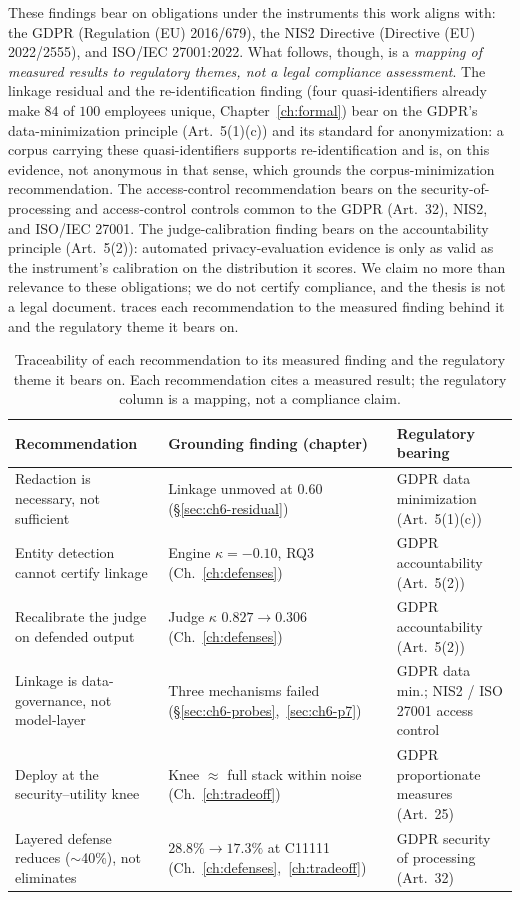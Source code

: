These findings bear on obligations under the instruments this work aligns with: the GDPR
(Regulation (EU) 2016/679), the NIS2 Directive (Directive (EU) 2022/2555), and ISO/IEC 27001:2022.
What follows, though, is a \emph{mapping of measured results to regulatory themes, not a legal compliance
assessment}. The linkage residual and the re-identification finding (four quasi-identifiers already make
$84$ of $100$ employees unique, Chapter~\ref{ch:formal}) bear on the GDPR's data-minimization principle
(Art.\ 5(1)(c)) and its standard for anonymization: a corpus carrying these quasi-identifiers supports
re-identification and is, on this evidence, not anonymous in that sense, which grounds the
corpus-minimization recommendation. The access-control recommendation bears on the security-of-processing
and access-control controls common to the GDPR (Art.\ 32), NIS2, and ISO/IEC 27001. The judge-calibration
finding bears on the accountability principle (Art.\ 5(2)): automated privacy-evaluation evidence is only
as valid as the instrument's calibration on the distribution it scores. We claim no more than relevance to
these obligations; we do not certify compliance, and the thesis is not a legal document.  traces each recommendation to the measured finding behind it and the regulatory theme it bears on.

\begin{table}[h]
\centering
\caption[Traceability of recommendations to findings and regulatory themes]{Traceability of each recommendation to its measured finding and the regulatory theme it bears on.
Each recommendation cites a measured result; the regulatory column is a mapping, not a compliance claim.}
\label{tab:disc-recommendations}
\begin{tabularx}{\textwidth}{LLL}
\toprule
\textbf{Recommendation} & \textbf{Grounding finding (chapter)} & \textbf{Regulatory bearing}\\
\midrule
Redaction is necessary, not sufficient & Linkage unmoved at $0.60$ (\S\ref{sec:ch6-residual}) & GDPR data minimization (Art.\ 5(1)(c))\\
\midrule
Entity detection cannot certify linkage & Engine $\kappa=-0.10$, RQ3 (Ch.~\ref{ch:defenses}) & GDPR accountability (Art.\ 5(2))\\
\midrule
Recalibrate the judge on defended output & Judge $\kappa$ $0.827\!\to\!0.306$ (Ch.~\ref{ch:defenses}) & GDPR accountability (Art.\ 5(2))\\
\midrule
Linkage is data-governance, not model-layer & Three mechanisms failed (\S\ref{sec:ch6-probes},~\ref{sec:ch6-p7}) & GDPR data min.; NIS2 / ISO 27001 access control\\
\midrule
Deploy at the security--utility knee & Knee $\approx$ full stack within noise (Ch.~\ref{ch:tradeoff}) & GDPR proportionate measures (Art.\ 25)\\
\midrule
Layered defense reduces ($\sim$40\%), not eliminates & $28.8\%\!\to\!17.3\%$ at C11111 (Ch.~\ref{ch:defenses},~\ref{ch:tradeoff}) & GDPR security of processing (Art.\ 32)\\
\bottomrule
\end{tabularx}
\end{table}

